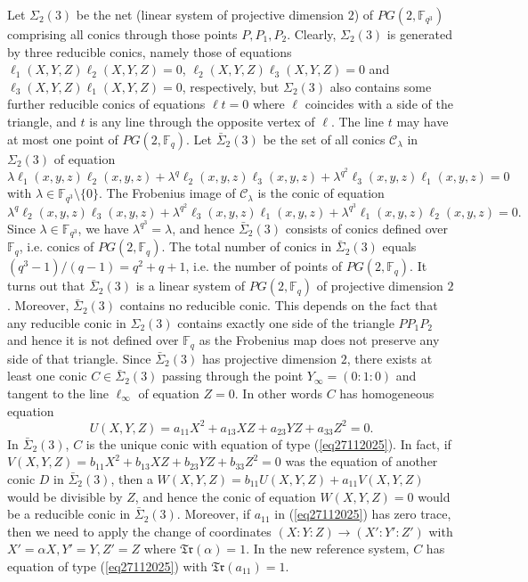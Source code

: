 \documentclass[sn-mathphys-num]{sn-jnl}%
\begin{document}
Let $\Sigma_2(3)$ be the net (linear system of projective dimension $2$) of $PG(2,\mathbb{F}_{q^3})$ comprising all conics through those points $P,P_1,P_2$. Clearly, $\Sigma_2(3)$ is generated by three reducible conics, namely those of equations $\ell_1(X,Y,Z)\ell_2(X,Y,Z)=0$,  $\ell_2(X,Y,Z)\ell_3(X,Y,Z)=0$ and $\ell_3(X,Y,Z)\ell_1(X,Y,Z)=0$, respectively, but   $\Sigma_2(3)$ also contains some further reducible conics of equations $\ell t=0$ where $\ell$ coincides with a side of the triangle, and $t$ is any line through the opposite vertex of $\ell$. The line $t$ may have at most one point of $PG(2,\mathbb{F}_q)$. Let $\bar{\Sigma}_2(3)$ be the set of all conics $\mathcal{C}_\lambda$ in $\Sigma_2(3)$ of equation $$\lambda\ell_1(x,y,z)\ell_2(x,y,z)+\lambda^q\ell_2(x,y,z)\ell_3(x,y,z)+\lambda^{q^2}\ell_3(x,y,z)\ell_1(x,y,z)=0$$ with $\lambda\in \mathbb{F}_{q^3}\setminus \{0\}$. The Frobenius image of $\mathcal{C}_\lambda$ is the conic of equation
$$\lambda^q\ell_2(x,y,z)\ell_3(x,y,z)+\lambda^{q^2}\ell_3(x,y,z)\ell_1(x,y,z)+\lambda^{q^3}\ell_1(x,y,z)\ell_2(x,y,z)=0.$$ Since $\lambda\in \mathbb{F}_{q^3}$, we have $\lambda^{q^3}=\lambda$, and hence $\bar{\Sigma}_2(3)$
consists of conics defined over $\mathbb{F}_q$, i.e. conics of $PG(2,\mathbb{F}_q)$. The total number of conics in $\bar{\Sigma}_2(3)$ equals $(q^3-1)/(q-1)=q^2+q+1$, i.e. the number of points of $PG(2,\mathbb{F}_q)$. It turns out that $\bar{\Sigma}_2(3)$ is a linear system of $PG(2,\mathbb{F}_q)$ of projective dimension $2$. Moreover, $\bar{\Sigma}_2(3)$ contains no reducible conic. This depends on the fact that any reducible conic in  $\Sigma_2(3)$ contains exactly one side of the triangle $PP_1P_2$ and hence it is not defined over $\mathbb{F}_q$ as the Frobenius map does not preserve any side of that triangle. Since $\bar{\Sigma}_2(3)$ has projective dimension $2$, there exists at least one conic $C\in \bar{\Sigma}_2(3)$ passing through the point $Y_\infty=(0:1:0)$ and tangent to the line $\ell_\infty$ of equation $Z=0$. In other words $C$ has homogeneous equation
\begin{equation}
\label{eq27112025}
U(X,Y,Z)=a_{11}X^2+a_{13}XZ+a_{23}YZ+a_{33}Z^2=0.
\end{equation}
In $\bar{\Sigma}_2(3)$, $C$ is the unique conic with equation of type (\ref{eq27112025}). In fact, if $V(X,Y,Z)=b_{11}X^2+b_{13}XZ+b_{23}YZ+b_{33}Z^2=0$ was the equation of another conic $D$ in $\bar{\Sigma}_2(3)$, then a $W(X,Y,Z)=b_{11}U(X,Y,Z)+a_{11}V(X,Y,Z)$ would be divisible by $Z$, and hence the conic of equation $W(X,Y,Z)=0$ would be a reducible conic in $\bar{\Sigma}_2(3)$.  Moreover, if $a_{11}$ in (\ref{eq27112025}) has zero trace, then we need to apply the change of coordinates $(X:Y:Z)\rightarrow (X':Y':Z')$ with $X'=\alpha X, Y'=Y, Z'=Z$ where $\mathfrak{Tr}(\alpha)=1$. In the new reference system, $C$ has equation of type (\ref{eq27112025}) with $\mathfrak{Tr}(a_{11})=1$.
\end{document}
